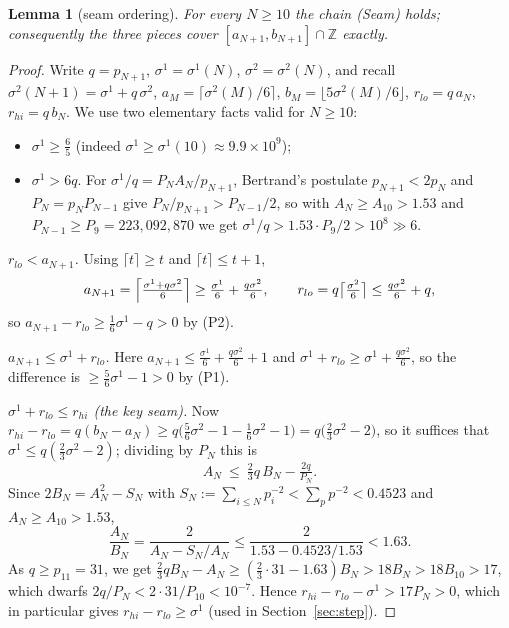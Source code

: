 \documentclass[11pt]{amsart}
\theoremstyle{plain}
\newtheorem{lemma}[theorem]{Lemma}
\theoremstyle{definition}
\newcommand{\Z}{\mathbb{Z}}
\begin{document}
\begin{lemma}[seam ordering]\label{lem:seam}
For every $N\ge 10$ the chain \textup{(Seam)} holds; consequently the three
pieces cover $[a_{N+1},b_{N+1}]\cap\Z$ exactly.
\end{lemma}

\begin{proof}
Write $q=p_{N+1}$, $\sigma^1=\sigma^1(N)$, $\sigma^2=\sigma^2(N)$, and recall
$\sigma^2(N+1)=\sigma^1+q\,\sigma^2$, $a_M=\lceil\sigma^2(M)/6\rceil$,
$b_M=\lfloor 5\sigma^2(M)/6\rfloor$, $r_{lo}=q\,a_N$, $r_{hi}=q\,b_N$.  We use two
elementary facts valid for $N\ge 10$:
\begin{itemize}[leftmargin=1.5em]
\item[(P1)] $\sigma^1\ge\tfrac65$ (indeed $\sigma^1\ge\sigma^1(10)\approx 9.9\times10^9$);
\item[(P2)] $\sigma^1>6q$.  For $\sigma^1/q=P_NA_N/p_{N+1}$, Bertrand's postulate
$p_{N+1}<2p_N$ and $P_N=p_N P_{N-1}$ give $P_N/p_{N+1}>P_{N-1}/2$, so with
$A_N\ge A_{10}>1.53$ and $P_{N-1}\ge P_9=223{,}092{,}870$ we get
$\sigma^1/q>1.53\cdot P_9/2>10^{8}\gg 6$.
\end{itemize}

\emph{$r_{lo}<a_{N+1}$.}  Using $\lceil t\rceil\ge t$ and $\lceil t\rceil\le t+1$,
\[
a_{N+1}=\Bigl\lceil\tfrac{\sigma^1+q\sigma^2}{6}\Bigr\rceil\ge\tfrac{\sigma^1}6+\tfrac{q\sigma^2}6,
\qquad
r_{lo}=q\bigl\lceil\tfrac{\sigma^2}6\bigr\rceil\le\tfrac{q\sigma^2}6+q,
\]
so $a_{N+1}-r_{lo}\ge\tfrac16\sigma^1-q>0$ by (P2).

\emph{$a_{N+1}\le\sigma^1+r_{lo}$.}  Here
$a_{N+1}\le\tfrac{\sigma^1}6+\tfrac{q\sigma^2}6+1$ and
$\sigma^1+r_{lo}\ge\sigma^1+\tfrac{q\sigma^2}6$, so the difference is
$\ge\tfrac56\sigma^1-1>0$ by (P1).

\emph{$\sigma^1+r_{lo}\le r_{hi}$ (the key seam).}  Now
$r_{hi}-r_{lo}=q(b_N-a_N)\ge q\bigl(\tfrac56\sigma^2-1-\tfrac16\sigma^2-1\bigr)
=q\bigl(\tfrac23\sigma^2-2\bigr)$, so it suffices that
$\sigma^1\le q(\tfrac23\sigma^2-2)$; dividing by $P_N$ this is
\[
A_N\ \le\ \tfrac23 q\,B_N-\tfrac{2q}{P_N}.
\]
Since $2B_N=A_N^2-S_N$ with $S_N:=\sum_{i\le N}p_i^{-2}<\sum_p p^{-2}<0.4523$ and
$A_N\ge A_{10}>1.53$,
\[
\frac{A_N}{B_N}=\frac{2}{A_N-S_N/A_N}\le\frac{2}{1.53-0.4523/1.53}<1.63 .
\]
As $q\ge p_{11}=31$, we get
$\tfrac23 qB_N-A_N\ge(\tfrac23\cdot31-1.63)B_N>18B_N>18B_{10}>17$, which dwarfs
$2q/P_N<2\cdot31/P_{10}<10^{-7}$.  Hence $r_{hi}-r_{lo}-\sigma^1>17P_N>0$, which
in particular gives $r_{hi}-r_{lo}\ge\sigma^1$ (used in
Section~\ref{sec:step}).


\end{proof}
\end{document}
